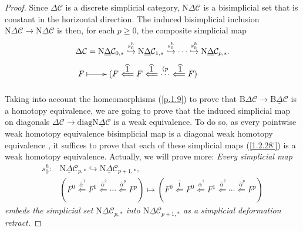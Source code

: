 \documentclass[]{amsart}
\begin{document}
\begin{proof}
Since ${\ensuremath{\Delta}}{\ensuremath{\mathcal{C}}}$ is a discrete simplicial category,  ${\ensuremath{\mathrm{N}}}{\ensuremath{\Delta}}{\ensuremath{\mathcal{C}}}$ is a bisimplicial set that is
constant in the horizontal direction. The induced bisimplicial inclusion
${\ensuremath{\mathrm{N}}}{\ensuremath{\Delta}}{\ensuremath{\mathcal{C}}}\to{\ensuremath{\mathrm{N}}}{\ensuremath{\underline{\Delta}}}{\ensuremath{\mathcal{C}}}$ is then, for each $p\geq 0$, the composite simplicial map
\begin{equation}\label{1.2.28'}\begin{array}{l} {\ensuremath{\Delta}}{\ensuremath{\mathcal{C}}}={\ensuremath{\mathrm{N}}}{\ensuremath{\underline{\Delta}}}{\ensuremath{\mathcal{C}}}_{0,*}\overset{s_0^h}\hookrightarrow {\ensuremath{\mathrm{N}}}{\ensuremath{\underline{\Delta}}}{\ensuremath{\mathcal{C}}}_{1,*}\overset{s_0^h}\hookrightarrow  \cdots \overset{s_0^h}\hookrightarrow {\ensuremath{\mathrm{N}}}{\ensuremath{\underline{\Delta}}}{\ensuremath{\mathcal{C}}}_{p,*}.\\[5pt]
\xymatrix{F\ar@{|->}[r]& (F\overset{\textstyle \widehat{1}}\Longleftarrow \underset{~}F
\overset{\textstyle \widehat{1}}\Longleftarrow \overset{(p}\cdots \overset{\ \textstyle
\widehat{1}}\Longleftarrow F)}\end{array}\end{equation}

Taking into account the homeomorphisms (\ref{p.1.9}) to prove that ${\ensuremath{\mathrm{B}}}{\ensuremath{\Delta}}{\ensuremath{\mathcal{C}}}\to{\ensuremath{\mathrm{B}}}{\ensuremath{\underline{\Delta}}}{\ensuremath{\mathcal{C}}}$
is a homotopy equivalence, we are going to  prove that the induced simplicial map on diagonals $
{\ensuremath{\Delta}}{\ensuremath{\mathcal{C}}}\to {\ensuremath{\mathrm{diag}}} {\ensuremath{\mathrm{N}}}{\ensuremath{\underline{\Delta}}}{\ensuremath{\mathcal{C}}}$ is a  weak equivalence. To do so, as every pointwise weak homotopy
equivalence bisimplicial map is a diagonal  weak homotopy equivalence \cite[IV, Proposition
1.7]{g-j}, it suffices to  prove that  each of these simplicial maps (\ref{1.2.28'}) is a weak
homotopy equivalence. Actually, we will prove more: {\em Every simplicial map $$\begin{array}{ll}
s_0^h:&{\ensuremath{\mathrm{N}}}{\ensuremath{\underline{\Delta}}}{\ensuremath{\mathcal{C}}}_{p,*}\hookrightarrow {\ensuremath{\mathrm{N}}}{\ensuremath{\underline{\Delta}}}{\ensuremath{\mathcal{C}}}_{p+1,*},\\[4pt]
&(F^0\overset{\ \textstyle \widehat{\alpha}^1}\Longleftarrow F^1 \overset{\ \textstyle
\widehat{\alpha}^2}\Longleftarrow \cdots \overset{\ \textstyle \widehat{\alpha}^p}\Longleftarrow
F^p)\mapsto (F^0\overset{\textstyle \widehat{1}}\Longleftarrow F^0\overset{\ \textstyle
\widehat{\alpha}^1}\Longleftarrow F^1 \overset{\ \textstyle \widehat{\alpha}^2}\Longleftarrow
\cdots \overset{\ \textstyle \widehat{\alpha}^p}\Longleftarrow F^p)\end{array}
$$
 embeds the simplicial set ${\ensuremath{\mathrm{N}}}{\ensuremath{\underline{\Delta}}}{\ensuremath{\mathcal{C}}}_{p,*}$ into ${\ensuremath{\mathrm{N}}}{\ensuremath{\underline{\Delta}}}{\ensuremath{\mathcal{C}}}_{p+1,*}$ as a simplicial deformation retract.}


\end{proof}
\end{document}

